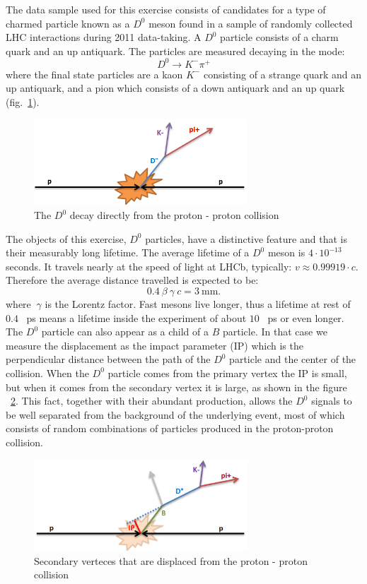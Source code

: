 \documentclass[3p,times,twocolumn]{elsarticle}
\begin{document}
The data sample used for this exercise consists of candidates for a type of charmed particle known as a $D^0$ meson found in a sample of randomly collected LHC interactions during 2011 data-taking. A $D^0$ particle consists of a charm quark and an up antiquark. The particles are measured decaying in the mode:
$$D^{0}\rightarrow K^{-}\pi ^{+}$$
where the final state particles are a kaon $K^{-}$ consisting of a strange quark and an up antiquark, and a pion which consists of a down antiquark and an up quark (fig.~\ref{d1}).
\begin{figure}[ht!]
	\centering
	\includegraphics[width=80mm]{25grrk4.png}
	\caption{The $D^0$ decay directly from the proton - proton collision \label{d1}}
\end{figure}
The objects of this exercise, $D^0$ particles, have a distinctive feature and that is their measurably long lifetime. The average lifetime of a $D^0$ meson is $4\cdot 10^{-13}$ seconds. It travels nearly at the speed of light at LHCb, typically: $v\approx 0.99919\cdot c$. Therefore the average distance travelled is expected to be:
$$0.4 ~\beta ~\gamma ~c =3 ~\mathrm{mm}.$$
where $~\gamma$ is the Lorentz factor. Fast mesons live longer, thus a lifetime at rest of $0.4$ ~ps means a lifetime inside the experiment of about $10$ ~ps or even longer. The $D^0$ particle can also appear as a child of a $B$ particle. In that case we measure the displacement as the impact parameter (IP) which is the perpendicular distance between the path of the $D^0$ particle and the center of the collision. When the $D^0$ particle comes from the primary vertex the IP is small, but when it comes from the secondary vertex it is large, as shown in the figure ~\ref{d2}. This fact, together with their abundant production, allows the $D^0$ signals to be well separated from the background of the underlying event, most of which consists of random combinations of particles produced in the proton-proton collision.

\begin{figure}[ht!]
	\centering
	\includegraphics[width=80mm]{311up94pro.jpg}
	\caption{Secondary verteces that are displaced from the proton - proton collision \label{d2}}
\end{figure}
\end{document}

